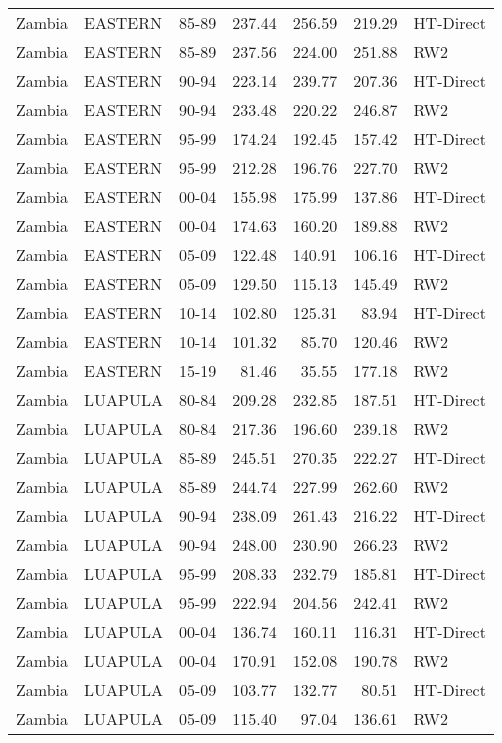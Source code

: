 \begin{longtable}{lllrrrl}
  Zambia & EASTERN & 85-89 & 237.44 & 256.59 & 219.29 & HT-Direct \\ 
  Zambia & EASTERN & 85-89 & 237.56 & 224.00 & 251.88 & RW2 \\ 
  Zambia & EASTERN & 90-94 & 223.14 & 239.77 & 207.36 & HT-Direct \\ 
  Zambia & EASTERN & 90-94 & 233.48 & 220.22 & 246.87 & RW2 \\ 
  Zambia & EASTERN & 95-99 & 174.24 & 192.45 & 157.42 & HT-Direct \\ 
  Zambia & EASTERN & 95-99 & 212.28 & 196.76 & 227.70 & RW2 \\ 
  Zambia & EASTERN & 00-04 & 155.98 & 175.99 & 137.86 & HT-Direct \\ 
  Zambia & EASTERN & 00-04 & 174.63 & 160.20 & 189.88 & RW2 \\ 
  Zambia & EASTERN & 05-09 & 122.48 & 140.91 & 106.16 & HT-Direct \\ 
  Zambia & EASTERN & 05-09 & 129.50 & 115.13 & 145.49 & RW2 \\ 
  Zambia & EASTERN & 10-14 & 102.80 & 125.31 & 83.94 & HT-Direct \\ 
  Zambia & EASTERN & 10-14 & 101.32 & 85.70 & 120.46 & RW2 \\ 
  Zambia & EASTERN & 15-19 & 81.46 & 35.55 & 177.18 & RW2 \\ 
  Zambia & LUAPULA & 80-84 & 209.28 & 232.85 & 187.51 & HT-Direct \\ 
  Zambia & LUAPULA & 80-84 & 217.36 & 196.60 & 239.18 & RW2 \\ 
  Zambia & LUAPULA & 85-89 & 245.51 & 270.35 & 222.27 & HT-Direct \\ 
  Zambia & LUAPULA & 85-89 & 244.74 & 227.99 & 262.60 & RW2 \\ 
  Zambia & LUAPULA & 90-94 & 238.09 & 261.43 & 216.22 & HT-Direct \\ 
  Zambia & LUAPULA & 90-94 & 248.00 & 230.90 & 266.23 & RW2 \\ 
  Zambia & LUAPULA & 95-99 & 208.33 & 232.79 & 185.81 & HT-Direct \\ 
  Zambia & LUAPULA & 95-99 & 222.94 & 204.56 & 242.41 & RW2 \\ 
  Zambia & LUAPULA & 00-04 & 136.74 & 160.11 & 116.31 & HT-Direct \\ 
  Zambia & LUAPULA & 00-04 & 170.91 & 152.08 & 190.78 & RW2 \\ 
  Zambia & LUAPULA & 05-09 & 103.77 & 132.77 & 80.51 & HT-Direct \\ 
  Zambia & LUAPULA & 05-09 & 115.40 & 97.04 & 136.61 & RW2 \\ 

\end{longtable}
